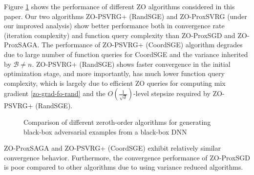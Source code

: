 \documentclass{article}
\theoremstyle{definition}
\theoremstyle{remark}
\begin{document}
{\color{Melon}
Figure \ref{attack-fig} shows
the performance of different ZO algorithms considered in this paper. Our two algorithms ZO-PSVRG+ (RandSGE) and ZO-ProxSVRG (under our improved analysis) show better performance
both in convergence rate (iteration complexity) and function query complexity than ZO-ProxSGD
and ZO-ProxSAGA. The performance of ZO-PSVRG+ (CoordSGE) algorithm degrades due to large number of function queries for CoordSGE and the variance inherited by $\mathcal{B} \neq n$. 
ZO-PSVRG+ (RandSGE) shows faster convergence in the initial optimization stage, and more importantly, has much lower function query complexity, which is largely
due to efficient ZO queries for computing mix gradient \eqref{zo-grad-fo-rand} and  the $O(\frac{1}{\sqrt{d}})$-level stepsize required by ZO-PSVRG+ (RandSGE).
}
\begin{figure}[htbp]\label{attack-fig}
%
%
\setlength{\abovecaptionskip}{2pt}
\caption{Comparison of different zeroth-order algorithms for generating black-box adversarial examples from a black-box DNN}
\end{figure}
{\color{Brown}
ZO-ProxSAGA and ZO-PSVRG+ (CoordSGE) exhibit relatively similar convergence behavior. Furthermore, the convergence performance of ZO-ProxSGD is poor compared to other algorithms due to using variance reduced algorithms. 
}
\end{document}
